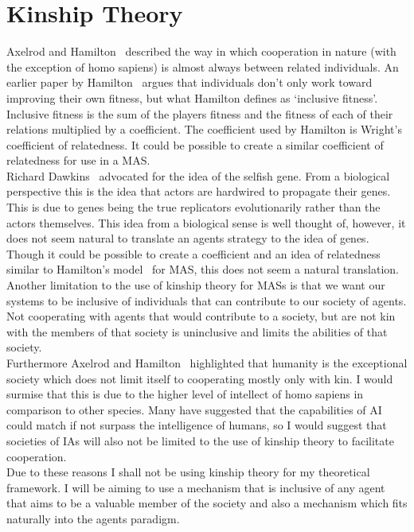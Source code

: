 \documentclass[]{final_report}
\begin{document}
\section{Kinship Theory}
\label{sec:kin}
Axelrod and Hamilton~\cite{evolution_of_cooperation} described the way in which cooperation in nature (with the exception of homo sapiens) is almost always between related individuals. An earlier paper by Hamilton~\cite{kinhamilton} argues that individuals don't only work toward improving their own fitness, but what Hamilton defines as `inclusive fitness'. Inclusive fitness is the sum of the players fitness and the fitness of each of their relations multiplied by a coefficient. The coefficient used by Hamilton is Wright's coefficient of relatedness. It could be possible to create a similar coefficient of relatedness for use in a MAS.\\
Richard Dawkins~\cite{selfish_gene} advocated for the idea of the selfish gene. From a biological perspective this is the idea that actors are hardwired to propagate their genes. This is due to genes being the true replicators evolutionarily rather than the actors themselves. This idea from a biological sense is well thought of, however, it does not seem natural to translate an agents strategy to the idea of genes.\\
Though it could be possible to create a coefficient and an idea of relatedness similar to Hamilton's model~\cite{kinhamilton} for MAS, this does not seem a natural translation. Another limitation to the use of kinship theory for MASs is that we want our systems to be inclusive of individuals that can contribute to our society of agents. Not cooperating with agents that would contribute to a society, but are not kin with the members of that society is uninclusive and limits the abilities of that society.\\
Furthermore Axelrod and Hamilton~\cite{evolution_of_cooperation} highlighted that humanity is the exceptional society which does not limit itself to cooperating mostly only with kin. I would surmise that this is due to the higher level of intellect of homo sapiens in comparison to other species. Many have suggested that the capabilities of AI could match if not surpass the intelligence of humans, so I would suggest that societies of IAs will also not be limited to the use of kinship theory to facilitate cooperation.\\
Due to these reasons I shall not be using kinship theory for my theoretical framework. I will be aiming to use a  mechanism that is inclusive of any agent that aims to be a valuable member of the society and also a mechanism which fits naturally into the agents paradigm. 
\end{document}
